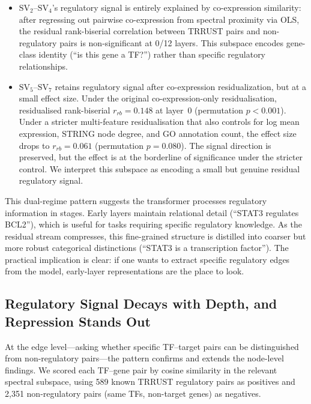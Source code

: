 \documentclass[12pt]{article}
\newcommand{\SV}[1]{\mathrm{SV}_{#1}}
\begin{document}
\begin{itemize}
  \item $\SV{2}$--$\SV{4}$'s regulatory signal is entirely explained by co-expression similarity: after regressing out pairwise co-expression from spectral proximity via OLS, the residual rank-biserial correlation between TRRUST pairs and non-regulatory pairs is non-significant at 0/12 layers. This subspace encodes gene-class identity (``is this gene a TF?'') rather than specific regulatory relationships.
  \item $\SV{5}$--$\SV{7}$ retains regulatory signal after co-expression residualization, but at a small effect size. Under the original co-expression-only residualisation, residualised rank-biserial $r_{rb} = 0.148$ at layer~0 (permutation $p < 0.001$). Under a stricter multi-feature residualisation that also controls for log mean expression, STRING node degree, and GO annotation count, the effect size drops to $r_{rb} = 0.061$ (permutation $p = 0.080$). The signal direction is preserved, but the effect is at the borderline of significance under the stricter control. We interpret this subspace as encoding a small but genuine residual regulatory signal.
\end{itemize}

This dual-regime pattern suggests the transformer processes regulatory information in stages.
Early layers maintain relational detail (``STAT3 regulates BCL2''), which is useful for tasks requiring specific regulatory knowledge.
As the residual stream compresses, this fine-grained structure is distilled into coarser but more robust categorical distinctions (``STAT3 is a transcription factor'').
The practical implication is clear: if one wants to extract specific regulatory edges from the model, early-layer representations are the place to look.

\subsection{Regulatory Signal Decays with Depth, and Repression Stands Out}
\label{sec:edge_signed}

At the edge level---asking whether specific TF--target pairs can be distinguished from non-regulatory pairs---the pattern confirms and extends the node-level findings.
We scored each TF--gene pair by cosine similarity in the relevant spectral subspace, using 589 known TRRUST regulatory pairs as positives and 2{,}351 non-regulatory pairs (same TFs, non-target genes) as negatives.
\end{document}
